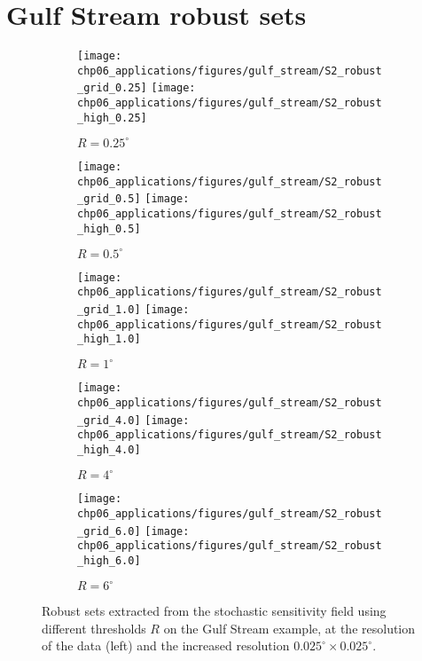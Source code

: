 \section{Gulf Stream robust sets}\label{app:s2_robust}


\begin{figure}
	\centering
	\begin{subfigure}{\textwidth}
		\texttt{[image: chp06\_applications/figures/gulf\_stream/S2\_robust\_grid\_0.25]}
		\texttt{[image: chp06\_applications/figures/gulf\_stream/S2\_robust\_high\_0.25]}
		\caption{\(R = 0.25^\circ\)}
	\end{subfigure}
	\begin{subfigure}{\textwidth}
		\texttt{[image: chp06\_applications/figures/gulf\_stream/S2\_robust\_grid\_0.5]}
		\texttt{[image: chp06\_applications/figures/gulf\_stream/S2\_robust\_high\_0.5]}
		\caption{\(R = 0.5^\circ\)}
	\end{subfigure}
	\begin{subfigure}{\textwidth}
		\texttt{[image: chp06\_applications/figures/gulf\_stream/S2\_robust\_grid\_1.0]}
		\texttt{[image: chp06\_applications/figures/gulf\_stream/S2\_robust\_high\_1.0]}
		\caption{\(R = 1^\circ\)}
	\end{subfigure}
	\begin{subfigure}{\textwidth}
		\texttt{[image: chp06\_applications/figures/gulf\_stream/S2\_robust\_grid\_4.0]}
		\texttt{[image: chp06\_applications/figures/gulf\_stream/S2\_robust\_high\_4.0]}
		\caption{\(R = 4^\circ\)}
	\end{subfigure}
	\begin{subfigure}{\textwidth}
		\texttt{[image: chp06\_applications/figures/gulf\_stream/S2\_robust\_grid\_6.0]}
		\texttt{[image: chp06\_applications/figures/gulf\_stream/S2\_robust\_high\_6.0]}
		\caption{\(R = 6^\circ\)}
	\end{subfigure}
	\caption{Robust sets extracted from the stochastic sensitivity field using different thresholds \(R\) on the Gulf Stream example, at the resolution of the data (left) and the increased resolution \(0.025^\circ \times 0.025^\circ\).}
	\label{fig:na_robust_extra}
\end{figure}
